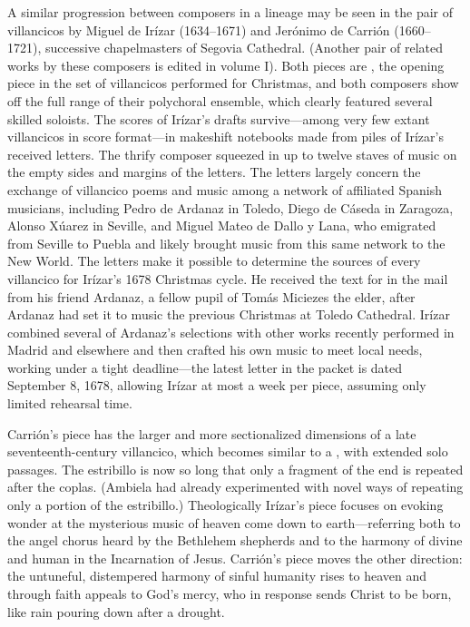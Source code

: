 A similar progression between composers in a lineage may be seen in the pair
of villancicos by Miguel de Irízar (1634--1671) and Jerónimo de Carrión
(1660--1721), successive chapelmasters of Segovia Cathedral.%
    \Autocite{Cashner:Segovia}
(Another pair of related works by these composers is edited in volume I).
Both pieces are , the opening piece in the set of
villancicos performed for Christmas, and both composers show off the full
range of their polychoral ensemble, which clearly featured several skilled
soloists.
The scores of Irízar's drafts survive---among very few extant villancicos in
score format---in makeshift notebooks made from piles of Irízar's received
letters.
The thrify composer squeezed in up to twelve staves of music on the empty
sides and margins of the letters.
The letters largely concern the exchange of villancico poems and music among a
network of affiliated Spanish musicians, including Pedro de Ardanaz in Toledo,
Diego de Cáseda in Zaragoza, Alonso Xúarez in Seville, and Miguel Mateo
de Dallo y Lana, who emigrated from Seville to Puebla and likely brought music
from this same network to the New World.
The letters make it possible to determine the sources of every villancico for
Irízar's 1678 Christmas cycle.%
    \Autocites
    {Rodriguez:Networks}
    {Rodriguez:SoloMadrid}
He received the text for  in the mail from his
friend Ardanaz, a fellow pupil of Tomás Miciezes the elder, after Ardanaz had
set it to music the previous Christmas at Toledo Cathedral.
Irízar combined several of Ardanaz's selections with other works recently
performed in Madrid and elsewhere and then crafted his own music to meet local
needs, working under a tight deadline---the latest letter in the packet is
dated September 8, 1678, allowing Irízar at most a week per piece, assuming
only limited rehearsal time.

Carrión's piece has the larger and more sectionalized dimensions of a late
seventeenth-century villancico, which becomes similar to a ,
with extended solo passages.
The estribillo is now so long that only a fragment of the end is repeated
after the coplas.
(Ambiela had already experimented with novel ways of repeating only a portion
of the estribillo.)%
    \Autocites
    {Calahorra:Suban}
    {Torrente:Estribillo}
Theologically Irízar's piece focuses on evoking wonder at the mysterious music
of heaven come down to earth---referring both to the angel chorus heard by the
Bethlehem shepherds and to the harmony of divine and human in the Incarnation
of Jesus.
Carrión's piece moves the other direction: the untuneful, distempered harmony
of sinful humanity rises to heaven and through faith appeals to God's mercy,
who in response sends Christ to be born, like rain pouring down after a
drought.

